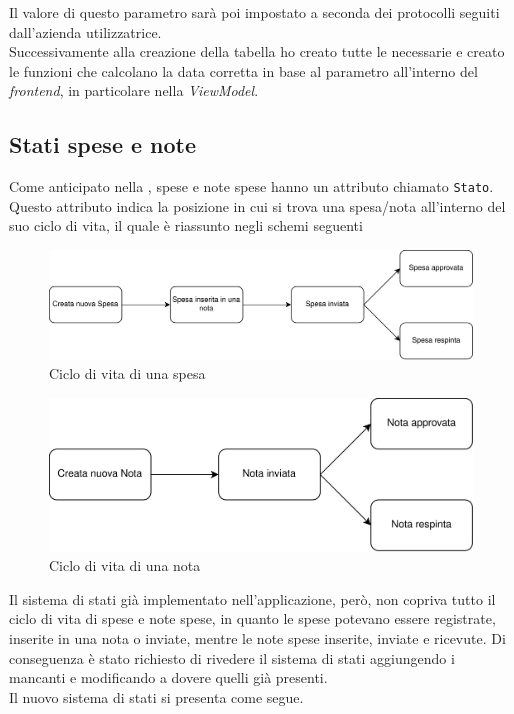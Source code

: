 \noindent Il valore di questo parametro sarà poi impostato a seconda dei protocolli seguiti dall'azienda utilizzatrice.\\
Successivamente alla creazione della tabella ho creato tutte le  necessarie e creato le funzioni che calcolano la data corretta in base al parametro all'interno del \textit{frontend}, in particolare nella \textit{ViewModel}.

\subsection{Stati spese e note}
\label{cap:stati}

Come anticipato nella , spese e note spese hanno un attributo chiamato \texttt{Stato}. Questo attributo indica la posizione in cui si trova una spesa/nota all'interno del suo ciclo di vita, il quale è riassunto negli schemi seguenti

\begin{figure}[h!]
    \centering
    \includegraphics[width=\columnwidth]{images/SpesaLife.png}
    \caption{Ciclo di vita di una spesa}
\end{figure}

\begin{figure}[H]
    \centering
    \includegraphics[width=.8\columnwidth]{images/NotaLife.png}
    \caption{Ciclo di vita di una nota}
\end{figure}

\noindent Il sistema di stati già implementato nell'applicazione, però, non copriva tutto il ciclo di vita di spese e note spese, in quanto le spese potevano essere registrate, inserite in una nota o inviate, mentre le note spese inserite, inviate e ricevute. Di conseguenza è stato richiesto di rivedere il sistema di stati aggiungendo i mancanti e modificando a dovere quelli già presenti.\\
Il nuovo sistema di stati si presenta come segue.

